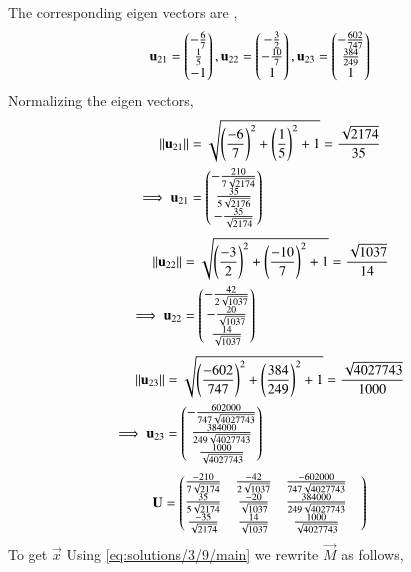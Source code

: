 The corresponding eigen vectors are , 
\begin{align}
	\mathbf{u}_{21}=\begin{pmatrix}-\frac{6}{7}\\ \frac{1}{5}\\ -1\end{pmatrix},
	\mathbf{u}_{22}=\begin{pmatrix}-\frac{3}{2}\\ -\frac{10}{7}\\1\end{pmatrix},
	\mathbf{u}_{23}=\begin{pmatrix}-\frac{602}{747} \\ \frac{384}{249} \\ 1\end{pmatrix}
\end{align}
Normalizing the eigen vectors, 
\begin{align}
	\left\lVert\mathbf{u}_{21}\right\rVert &=\sqrt{\left(\frac{-6}{7}\right)^2+\left(\frac{1}{5}\right)^2+1} =\frac{\sqrt{2174}}{35}\\
	\implies \mathbf{u}_{21} &=\begin{pmatrix}-\frac{210}{7 \sqrt{2174}} \\ \frac{35}{5 \sqrt{2176}} \\ -\frac{35}{\sqrt{2174}}\end{pmatrix}
\end{align}
\begin{align}
	\left\lVert\mathbf{u}_{22}\right\rVert&=\sqrt{\left(\frac{-3}{2}\right)^2+\left(\frac{-10}{7}\right)^2+1}=\frac{\sqrt{1037}}{14}\\
	\implies \mathbf{u}_{22}&=\begin{pmatrix}-\frac{42}{2\sqrt{1037}} \\ -\frac{20}{\sqrt{1037}} \\ \frac{14}{\sqrt{1037}}\end{pmatrix}
\end{align}
\begin{align}
	\left\lVert\mathbf{u}_{23}\right\rVert &=\sqrt{\left(\frac{-602}{747}\right)^2+\left(\frac{384}{249}\right)^2+1}= \frac{\sqrt{4027743}}{1000}\\
	\implies \mathbf{u}_{23} &=\begin{pmatrix}-\frac{602000}{747\sqrt{4027743}} \\ \frac{384000}{249\sqrt{4027743}}\\
		                      \frac{1000}{\sqrt{4027743}}\end{pmatrix}
\end{align}
\begin{align}
	\mathbf{U}=\begin{pmatrix}\frac{-210}{7\sqrt{2174}} & \frac{-42}{2\sqrt{1037}} & \frac{-602000}{747\sqrt{4027743}} &\\ \frac{35}{5\sqrt{2174}}& \frac{-20}{\sqrt{1037}}&  \frac{384000}{249\sqrt{4027743}} \\
		\frac{-35}{\sqrt{2174}}& \frac{14}{\sqrt{1037}} &   \frac{1000}{\sqrt{4027743}}\end{pmatrix}
\end{align}
{To get $\vec{x}$ }
Using \eqref{eq:solutions/3/9/main} we rewrite $\vec{M}$ as follows,
